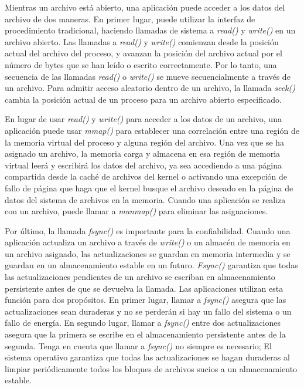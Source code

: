\documentclass[10pt]{book}
\begin{document}
Mientras un archivo está abierto, una aplicación puede acceder a los datos del archivo de dos maneras. En primer lugar, puede utilizar la interfaz de procedimiento tradicional, haciendo llamadas de sistema a \textit{read()} y \textit{write()} en un archivo abierto. Las llamadas a \textit{read()} y \textit{write()} comienzan desde la posición actual del archivo del proceso, y avanzan la posición del archivo actual por el número de bytes que se han leído o escrito correctamente. Por lo tanto, una secuencia de las llamadas \textit{read()} o \textit{write()} se mueve secuencialmente a través de un archivo. Para admitir acceso aleatorio dentro de un archivo, la llamada \textit{seek()} cambia la posición actual de un proceso para un archivo abierto especificado.

En lugar de usar \textit{read()} y \textit{write()} para acceder a los datos de un archivo, una aplicación puede usar \textit{mmap()} para establecer una correlación entre una región de la memoria virtual del proceso y alguna región del archivo. Una vez que se ha asignado un archivo, la memoria carga y almacena en esa región de memoria virtual leerá y escribirá los datos del archivo, ya sea accediendo a una página compartida desde la caché de archivos del kernel o activando una excepción de fallo de página que haga que el kernel busque el archivo deseado en la página de datos del sistema de archivos en la memoria. Cuando una aplicación se realiza con un archivo, puede llamar a \textit{munmap()} para eliminar las asignaciones.

Por último, la llamada \textit{fsync()} es importante para la confiabilidad. Cuando una aplicación actualiza un archivo a través de \textit{write()} o un almacén de memoria en un archivo asignado, las actualizaciones se guardan en memoria intermedia y se guardan en un almacenamiento estable en un futuro. \textit{Fsync()} garantiza que todas las actualizaciones pendientes de un archivo se escriban en almacenamiento persistente antes de que se devuelva la llamada. Las aplicaciones utilizan esta función para dos propósitos. En primer lugar, llamar a \textit{fsync()} asegura que las actualizaciones sean duraderas y no se perderán si hay un fallo del sistema o un fallo de energía. En segundo lugar, llamar a \textit{fsync()} entre dos actualizaciones asegura que la primera se escribe en el almacenamiento persistente antes de la segunda. Tenga en cuenta que llamar a \textit{fsync()} no siempre es necesario; El sistema operativo garantiza que todas las actualizaciones se hagan duraderas al limpiar periódicamente todos los bloques de archivos sucios a un almacenamiento estable.
\end{document}
